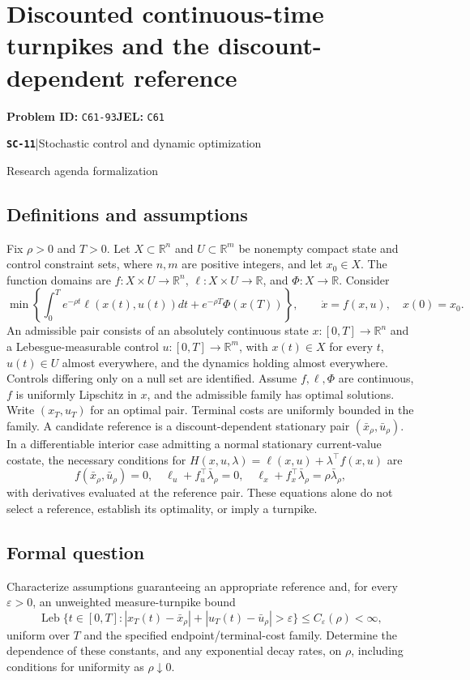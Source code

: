 \documentclass[11pt,a4paper]{article}
\newcommand{\R}{\mathbb R}
\newcommand{\entrymeta}[3]{{\sffamily\small\color{muted}\textbf{\texttt{#1}}\quad|\quad #2\par #3\par}}
\begin{document}
\section*{Discounted continuous-time turnpikes and the discount-dependent reference}
\textbf{Problem ID:} \texttt{C61-93}\quad \textbf{JEL:} \texttt{C61}\par
\label{problem:OP-0572}
\label{beyond:SC-11}
\entrymeta{SC-11}{Stochastic control and dynamic optimization}{Research agenda formalization}
\subsection*{Definitions and assumptions}
Fix $\rho>0$ and $T>0$. Let $X\subset\R^n$ and
$U\subset\R^m$ be nonempty compact state and control constraint sets,
where $n,m$ are positive integers, and let $x_0\in X$.
The function domains are $f:X\times U\to\R^n$,
$\ell:X\times U\to\R$, and $\Phi:X\to\R$. Consider
\[
 \min\left\{\int_0^T e^{-\rho t}\ell(x(t),u(t))dt
          +e^{-\rho T}\Phi(x(T))\right\},\qquad
 \dot x=f(x,u),\quad x(0)=x_0.
\]
An admissible pair consists of an absolutely continuous state
$x:[0,T]\to\R^n$ and a Lebesgue-measurable control
$u:[0,T]\to\R^m$, with $x(t)\in X$ for every $t$,
$u(t)\in U$ almost everywhere, and the dynamics holding almost
everywhere. Controls differing only on a null set are identified.
Assume $f,\ell,\Phi$ are continuous, $f$ is uniformly Lipschitz in
$x$, and the admissible family has optimal solutions. Write
$(x_T,u_T)$ for an optimal pair. Terminal costs
are uniformly bounded in the family. A candidate reference is a
discount-dependent stationary pair $(\bar x_\rho,\bar u_\rho)$.
In a differentiable interior case admitting a normal stationary
current-value costate, the necessary conditions for
$H(x,u,\lambda)=\ell(x,u)+\lambda^\top f(x,u)$ are
\[
 f(\bar x_\rho,\bar u_\rho)=0,\quad
 \ell_u+f_u^\top\bar\lambda_\rho=0,\quad
 \ell_x+f_x^\top\bar\lambda_\rho=\rho\bar\lambda_\rho,
\]
with derivatives evaluated at the reference pair. These equations alone
do not select a reference, establish its optimality, or imply a turnpike.
\subsection*{Formal question}
Characterize assumptions guaranteeing an appropriate reference and,
for every $\varepsilon>0$, an unweighted measure-turnpike bound
\[
 \operatorname{Leb}\{t\in[0,T]:
 |x_T(t)-\bar x_\rho|+|u_T(t)-\bar u_\rho|>\varepsilon\}
 \leq C_\varepsilon(\rho)<\infty,
\]
uniform over $T$ and the specified endpoint/terminal-cost family.
Determine the dependence of these constants, and any exponential
decay rates, on $\rho$, including conditions for uniformity as
$\rho\downarrow0$.
\end{document}
